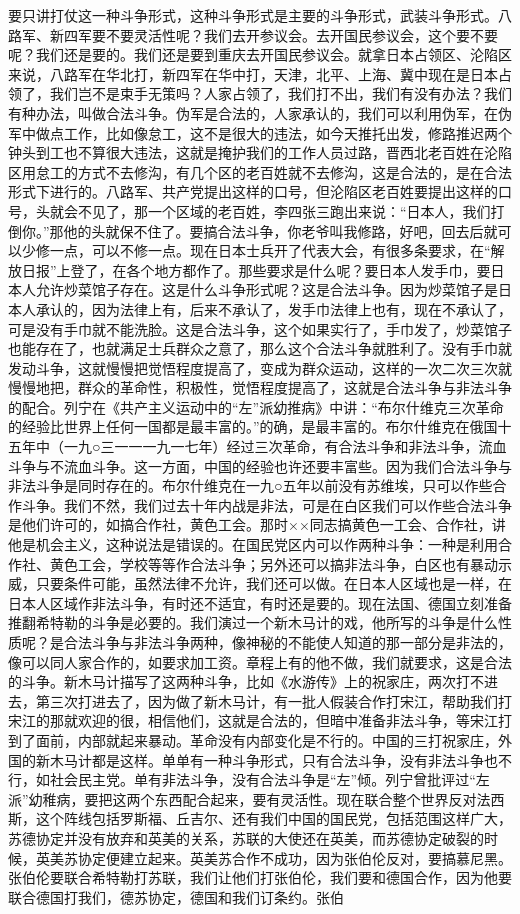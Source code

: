 要只讲打仗这一种斗争形式，这种斗争形式是主要的斗争形式，武装斗争形式。八路军、新四军要不要灵活性呢？我们去开参议会。去开国民参议会，这个要不要呢？我们还是要的。我们还是要到重庆去开国民参议会。就拿日本占领区、沦陷区来说，八路军在华北打，新四军在华中打，天津，北平、上海、冀中现在是日本占领了，我们岂不是束手无策吗？人家占领了，我们打不出，我们有没有办法？我们有种办法，叫做合法斗争。伪军是合法的，人家承认的，我们可以利用伪军，在伪军中做点工作，比如像怠工，这不是很大的违法，如今天推托出发，修路推迟两个钟头到工也不算很大违法，这就是掩护我们的工作人员过路，晋西北老百姓在沦陷区用怠工的方式不去修沟，有几个区的老百姓就不去修沟，这是合法的，是在合法形式下进行的。八路军、共产党提出这样的口号，但沦陷区老百姓要提出这样的口号，头就会不见了，那一个区域的老百姓，李四张三跑出来说：“日本人，我们打倒你。”那他的头就保不住了。要搞合法斗争，你老爷叫我修路，好吧，回去后就可以少修一点，可以不修一点。现在日本士兵开了代表大会，有很多条要求，在“解放日报”上登了，在各个地方都作了。那些要求是什么呢？要日本人发手巾，要日本人允许炒菜馆子存在。这是什么斗争形式呢？这是合法斗争。因为炒菜馆子是日本人承认的，因为法律上有，后来不承认了，发手巾法律上也有，现在不承认了，可是没有手巾就不能洗脸。这是合法斗争，这个如果实行了，手巾发了，炒菜馆子也能存在了，也就满足士兵群众之意了，那么这个合法斗争就胜利了。没有手巾就发动斗争，这就慢慢把觉悟程度提高了，变成为群众运动，这样的一次二次三次就慢慢地把，群众的革命性，积极性，觉悟程度提高了，这就是合法斗争与非法斗争的配合。列宁在《共产主义运动中的“左”派幼推病》中讲：“布尔什维克三次革命的经验比世界上任何一国都是最丰富的。”的确，是最丰富的。布尔什维克在俄国十五年中（一九○三一一一九一七年）经过三次革命，有合法斗争和非法斗争，流血斗争与不流血斗争。这一方面，中国的经验也许还要丰富些。因为我们合法斗争与非法斗争是同时存在的。布尔什维克在一九○五年以前没有苏维埃，只可以作些合作斗争。我们不然，我们过去十年内战是非法，可是在白区我们可以作些合法斗争是他们许可的，如搞合作社，黄色工会。那时××同志搞黄色一工会、合作社，讲他是机会主义，这种说法是错误的。在国民党区内可以作两种斗争：一种是利用合作社、黄色工会，学校等等作合法斗争；另外还可以搞非法斗争，白区也有暴动示威，只要条件可能，虽然法律不允许，我们还可以做。在日本人区域也是一样，在日本人区域作非法斗争，有时还不适宜，有时还是要的。现在法国、德国立刻准备推翻希特勒的斗争是必要的。我们演过一个新木马计的戏，他所写的斗争是什么性质呢？是合法斗争与非法斗争两种，像神秘的不能使人知道的那一部分是非法的，像可以同人家合作的，如要求加工资。章程上有的他不做，我们就要求，这是合法的斗争。新木马计描写了这两种斗争，比如《水游传》上的祝家庄，两次打不进去，第三次打进去了，因为做了新木马计，有一批人假装合作打宋江，帮助我们打宋江的那就欢迎的很，相信他们，这就是合法的，但暗中准备非法斗争，等宋江打到了面前，内部就起来暴动。革命没有内部变化是不行的。中国的三打祝家庄，外国的新木马计都是这样。单单有一种斗争形式，只有合法斗争，没有非法斗争也不行，如社会民主党。单有非法斗争，没有合法斗争是“左”倾。列宁曾批评过“左派”幼稚病，要把这两个东西配合起来，要有灵活性。现在联合整个世界反对法西斯，这个阵线包括罗斯福、丘吉尔、还有我们中国的国民党，包括范围这样广大，苏德协定并没有放弃和英美的关系，苏联的大使还在英美，而苏德协定破裂的时候，英美苏协定便建立起来。英美苏合作不成功，因为张伯伦反对，要搞慕尼黑。张伯伦要联合希特勒打苏联，我们让他们打张伯伦，我们要和德国合作，因为他要联合德国打我们，德苏协定，德国和我们订条约。张伯